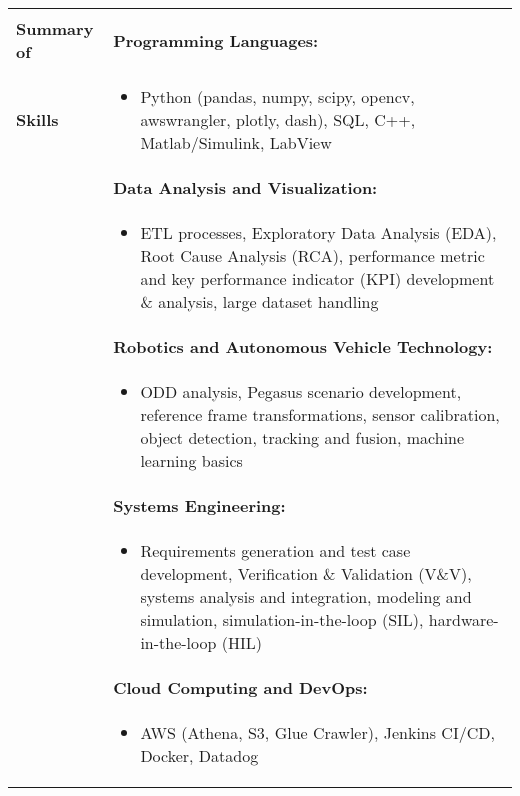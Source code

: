 \begin{tabular}{L{\hlcolw}  L{\rcolw}}
	\hline \\
	\textbf{\Large Summary of } & 
	\textbf{Programming Languages:}
	\\
	
	\textbf{\Large Skills} & 
	\vspace{-0.25in}
	\begin{itemize}[leftmargin = \itemmargin]
		\item Python (pandas, numpy, scipy, opencv, awswrangler, plotly, dash), SQL, C++, Matlab/Simulink, LabView	
	\end{itemize} \\

	& \textbf{Data Analysis and Visualization:} \\
	&
	\vspace{-0.25in}
	\begin{itemize}[leftmargin = \itemmargin]
		\item ETL processes, Exploratory Data Analysis (EDA), Root Cause Analysis (RCA), 
		performance metric and key performance indicator (KPI) development \& analysis, large dataset handling
	\end{itemize}
	\\

	& \textbf{Robotics and Autonomous Vehicle Technology:} \\
	& 
	\vspace{-0.25in}
	\begin{itemize}[leftmargin = \itemmargin]
		\item ODD analysis, Pegasus scenario development, reference frame transformations, sensor calibration, object detection, tracking and fusion, machine learning basics
	\end{itemize}
	\\

	& \textbf{Systems Engineering:} \\
	&
	\vspace{-0.25in}
	\begin{itemize}[leftmargin = \itemmargin]
		\item Requirements generation and test case development, Verification \& Validation (V\&V), systems analysis and integration, modeling and simulation, simulation-in-the-loop (SIL), hardware-in-the-loop (HIL)
	\end{itemize}
	\\


	
	& \textbf{Cloud Computing and DevOps:} \\
	&
	\vspace{-0.25in}
	\begin{itemize}[leftmargin = \itemmargin]
		\item AWS (Athena, S3, Glue Crawler), Jenkins CI/CD, Docker, Datadog
	\end{itemize}
	\\


\end{tabular}
